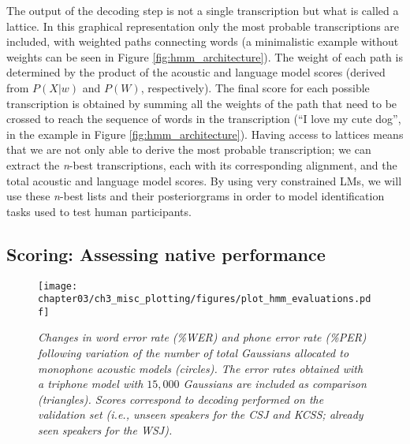 The output of the decoding step is not a single transcription but what is called a lattice. In this graphical representation only the most probable transcriptions are included, with weighted paths connecting words (a minimalistic example without weights can be seen in Figure \ref{fig:hmm_architecture}). The weight of each path is determined by the product of the acoustic and language model scores (derived from $P(X|w)$ and $P(W)$, respectively). The final score for each possible transcription is obtained by summing all the weights of the path that need to be crossed to reach the sequence of words in the transcription (``I love my cute dog'', in the example in Figure \ref{fig:hmm_architecture}). Having access to lattices means that we are not only able to derive the most probable transcription; we can extract the \textit{n}-best transcriptions, each with its corresponding alignment, and the total acoustic and language model scores. By using very constrained LMs, we will use these \textit{n}-best lists and their posteriorgrams in order to model identification tasks used to test human participants.   

\subsection{Scoring: Assessing native performance}

\begin{figure}[htb]
\centering
\texttt{[image: chapter03/ch3\_misc\_plotting/figures/plot\_hmm\_evaluations.pdf]}
\caption{\textit{Changes in word error rate (\%WER) and phone error rate (\%PER) following variation of the number of total Gaussians allocated to monophone acoustic models (circles). The error rates obtained with a triphone model with $15,000$ Gaussians are included as comparison (triangles). Scores correspond to decoding performed on the validation set (i.e., unseen speakers for the CSJ and KCSS; already seen speakers for the WSJ).}}
\label{fig:hmm_gaussians}
\end{figure}


